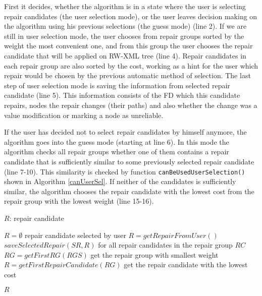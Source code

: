 First it decides, whether the algorithm is in a state where the user is selecting repair candidates (the user selection mode), or the user leaves decision making on the algorithm using his previous selections (the guess mode) (line 2). If we are still in user selection mode, the user chooses from repair groups sorted by the weight the most convenient one, and from this group the user chooses the repair candidate that will be applied on RW-XML tree (line 4). Repair candidates in each repair group are also sorted by the cost, working as a hint for the user which repair would be chosen by the previous automatic method of selection. The last step of user selection mode is saving the information from selected repair candidate (line 5). This information consists of the FD which this candidate repairs, nodes the repair changes (their paths) and also whether the change was a value modification or marking a node as unreliable.

If the user has decided not to select repair candidates by himself anymore, the algorithm goes into the guess mode (starting at line 6). In this mode the algorithm checks all repair groups whether one of them contains a repair candidate that is sufficiently similar to some previously selected repair candidate (line 7-10). This similarity is checked by function \texttt{canBeUsedUserSelection()} shown in Algorithm \ref{canUserSel}. If neither of the candidates is sufficiently similar, the algorithm chooses the repair candidate with the lowest cost from the repair group with the lowest weight (line 15-16).

\begin{algorithm}[H]
\caption{$selectRepairByUser(RGS, SR, t)$}
\label{selectUser}
\begin{algorithmic}[1]
\ENSURE $R$: repair candidate

\STATE $R = \emptyset$
    \STATE \COMMENT repair candidate selected by user
    \STATE $R = getRepairFromUser()$
    \STATE $saveSelectedRepair(SR, R)$
\ELSE
        \STATE \COMMENT for all repair candidates in the repair group
                \RETURN $RC$
            \ENDIF
        \ENDFOR
    \ENDFOR
    \STATE $RG = getFirstRG(RGS)$ \COMMENT get the repair group with smallest weight
    \STATE $R = getFirstRepairCandidate(RG)$ \COMMENT get the repair candidate with the lowest cost
\ENDIF

\RETURN $R$
\end{algorithmic}
\end{algorithm}

